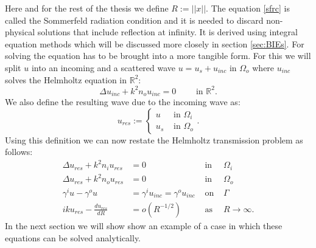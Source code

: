 \documentclass[a4paper, oneside]{discothesis}
\begin{document}
Here and for the rest of the thesis we define $R := ||x||$.
The equation \ref{sfrc} is called the Sommerfeld radiation condition and it is needed to discard non-physical solutions that include reflection at infinity. 
It is derived using integral equation methods which will be discussed more closely in section \ref{sec:BIEs}.
For solving the equation has to be brought into a more tangible form.
For this we will split $u$ into an incoming and a scattered wave $u = u_{s} + u_{inc}$ in $\Omega_o$ where $u_{inc}$ solves the Helmholtz equation in $\mathbb{R}^2$:
\begin{equation}
	\Delta u_{inc} + k^2n_ou_{inc} = 0 \qquad \text{ in } \mathbb{R}^2. \label{hme1}
\end{equation}
We also define the resulting wave due to the incoming wave as:
\begin{equation}
	u_{res} := 
	\begin{cases}
		u &\text{ in } \Omega_i \\
		u_s &\text{ in } \Omega_o
	\end{cases}
	.
\end{equation}
Using this definition we can now restate the Helmholtz transmission problem as follows:
\begin{align}
	\Delta u_{res} + k^2n_iu_{res} &= 0 & \text{ in }& \Omega_i \label{hme2}\\
	\Delta u_{res} + k^2n_ou_{res} &= 0 & \text{ in }& \Omega_o \label{hme3}\\
	\gamma^iu - \gamma^ou&= \gamma^iu_{inc} = \gamma^ou_{inc} & \text{ on }& \Gamma \label{bc}\\
	iku_{res} - \frac{du_{res}}{dR} &= o(R^{-1/2}) & \text{ as }& R \rightarrow \infty.
\end{align}
In the next section we will show show an example of a case in which these equations can be solved analytically.
\end{document}
